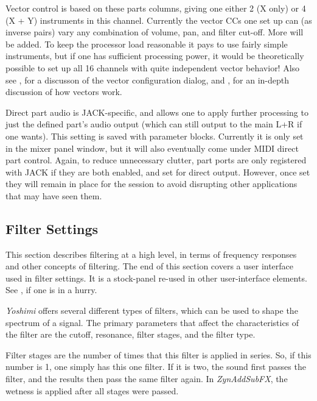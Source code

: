    Vector control is based on these parts columns, giving one either 2 (X
   only) or 4 (X + Y) instruments in this channel. Currently the vector
   CCs one set up can (as inverse pairs) vary any combination of volume, pan,
   and filter cut-off.  More will be added.  To keep the processor load
   reasonable it pays to use fairly simple instruments, but if one has
   sufficient processing power, it would be theoretically possible to set up
   all 16 channels with quite independent vector behavior!
   Also see
   , for a discusson of the vector
   configuration dialog, and , for an in-depth
   discussion of how vectors work.

   Direct part audio is JACK-specific, and allows one to apply further
   processing to just the defined part's audio output (which can still output
   to the main L+R if one wants). This setting is saved with parameter
   blocks. Currently it is only set in the mixer panel window, but it will also
   eventually come under MIDI direct part control.  Again, to reduce
   unnecessary clutter, part ports are only registered with JACK if they are
   both enabled, and set for direct output. However, once set they will remain
   in place for the session to avoid disrupting other applications that may
   have seen them.

\subsection{Filter Settings}
\label{subsec:filter_settings}

   This section describes filtering at a high level, in terms of frequency
   responses and other concepts of filtering.
   The end of this section covers a user interface used in filter settings.
   It is a stock-panel re-used in other user-interface elements.
   See ,
   if one is in a hurry.

   \textsl{Yoshimi}
   offers several different types of filters, which can be used to
   shape the spectrum of a signal. The primary parameters that affect the
   characteristics of the filter are the cutoff, resonance, filter stages, and
   the filter type.

   Filter stages are the number of times that this filter is applied in
   series. So, if this number is 1, one simply has this one filter. If it is
   two, the sound first passes the filter, and the results then pass the same
   filter again. In \textsl{ZynAddSubFX}, the wetness is applied after all
   stages were passed.

